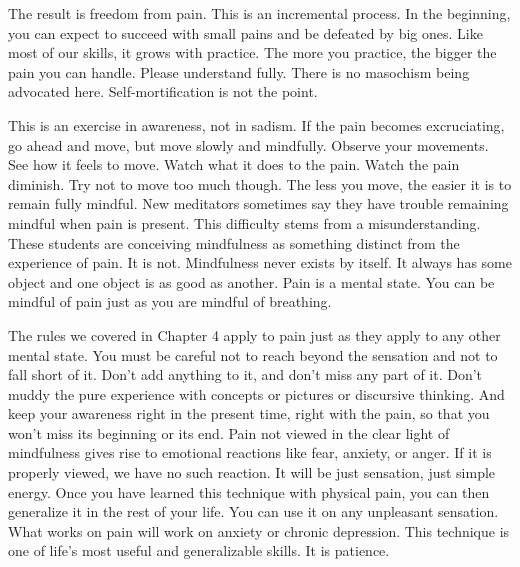 The result is freedom from pain.  This is an incremental process. In the
beginning, you can expect to succeed with small pains and be defeated by big
ones. Like most of our skills, it grows with practice. The more you practice,
the bigger the pain you can handle. Please understand fully.
There is no masochism being advocated here. Self-mortification is not the
point.

This is an exercise in awareness, not in sadism. If the pain becomes
excruciating, go ahead and move, but move slowly and mindfully. Observe your
movements. See how it feels to move. Watch what it does to the pain. Watch the
pain diminish. Try not to move too much though. The less you move, the easier it
is to remain fully mindful. New meditators sometimes say they have trouble
remaining mindful when pain is present. This difficulty stems from a
misunderstanding. These students are conceiving mindfulness as something
distinct from the experience of pain. It is not. Mindfulness never exists by
itself. It always has some object and one object is as good as another. Pain is
a mental state. You can be mindful of pain just as you are mindful of breathing.

The rules we covered in Chapter 4 apply to pain just as they apply to any other
mental state. You must be careful not to reach beyond the sensation and not to
fall short of it. Don't add anything to it, and don't miss any part of it. Don't
muddy the pure experience with concepts or pictures or discursive thinking. And
keep your awareness right in the present time, right with the pain, so that you
won't miss its beginning or its end. Pain not viewed in the clear light of
mindfulness gives rise to emotional reactions like fear, anxiety, or anger. If
it is properly viewed, we have no such reaction. It will be just sensation, just
simple energy. Once you have learned this technique with physical pain, you can then
generalize it in the rest of your life. You can use it on any unpleasant
sensation. What works on pain will work on anxiety or chronic depression. This
technique is one of life's most useful and generalizable skills. It is patience.

